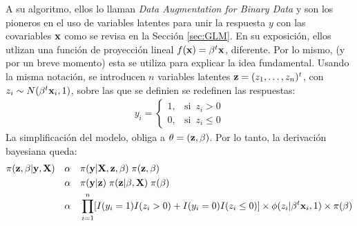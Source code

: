\documentclass[../Main/Main.tex]{subfiles}
\begin{document}
A su algoritmo, ellos lo llaman \textit{Data Augmentation for Binary Data} y son los pioneros en el uso de variables latentes para unir la respuesta $y$ con las covariables $\mathbf{x}$ como se revisa en la Sección \ref{sec:GLM}. En su exposición, ellos utlizan una función de proyección lineal $f(\mathbf{x}) = \beta^t\mathbf{x}$, diferente. Por lo mismo, (y por un breve momento) esta se utiliza para explicar la idea fundamental. Usando la misma notación, se introducen $n$ variables latentes $\mathbf{z} = (z_1,\ldots,z_n)^t$, con $z_i \sim N(\beta^t\mathbf{x}_i,1)$, sobre las que se definien se redefinen las respuestas:
\begin{align}
y_i = 
	\begin{cases}
		1, & \text{si }\, z_i > 0 \\											0, & \text{si }\, z_i \leq 0 
	\end{cases} \label{ec:DefY}
\end{align}
La simplificación del modelo, obliga a $\theta = (\mathbf{z}, \beta)$. Por lo tanto, la derivación bayesiana queda:
\begin{align}
	\pi(\mathbf{z}, \beta| \mathbf{y}, \mathbf{X}) \quad 
	& \alpha \quad \pi(\mathbf{y} | \mathbf{X}, \mathbf{z}, \beta) 
		\; \pi(\mathbf{z}, \beta) \nonumber \\
	& \alpha \quad \pi(\mathbf{y} | \mathbf{z})\; \pi(\mathbf{z}|\beta,\mathbf{X}) 
		\; \pi(\beta) \nonumber \\
	& \alpha \quad \prod_{i = 1}^n[I(y_i = 1)I(z_i > 0) +
		 I(y_i = 0)I(z_i \leq 0)] \times \phi(z_i|\beta^t\mathbf{x}_i,1) 				\times \pi(\beta) \label{ec:BayesChibbPosterior}
\end{align}
\end{document}
